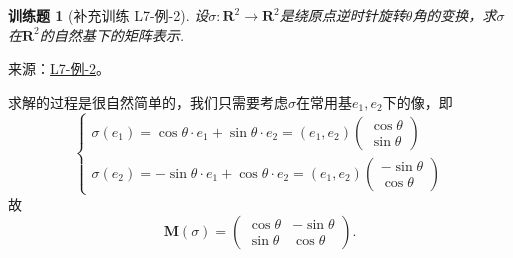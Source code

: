 \documentclass[UTF8,12pt,a4paper,fontset=fandol]{ctexart}
\newtheorem{exercise}{训练题}[section]
\begin{document}
\begin{exercise}[补充训练 L7-例-2]\label{prob:L7-例-2}
设$\sigma\colon\mathbf{R}^2\to\mathbf{R}^2$是绕原点逆时针旋转$\theta$角的变换，求$\sigma$在$\mathbf{R}^2$的自然基下的矩阵表示.
\end{exercise}
\noindent 来源：\href{https://github.com/yhwu-is/Linear-Algebra-Left-Undone/blob/new/%E8%AE%B2%E4%B9%89/%E4%B8%93%E9%A2%98/7%20%E7%BA%BF%E6%80%A7%E6%98%A0%E5%B0%84%E7%9F%A9%E9%98%B5%E8%A1%A8%E7%A4%BA%E4%B8%8E%E7%9F%A9%E9%98%B5%E8%BF%90%E7%AE%97%E5%9F%BA%E7%A1%80.tex}{L7-例-2}。
\begin{solve}
求解的过程是很自然简单的，我们只需要考虑$\sigma$在常用基$e_1,e_2$下的像，即
    \[
    \begin{cases}
        \sigma(e_1)=\cos\theta\cdot e_1+\sin\theta\cdot e_2=(e_1,e_2)\begin{pmatrix}
            \cos\theta \\ \sin\theta
        \end{pmatrix} \\
        \sigma(e_2)=-\sin\theta\cdot e_1+\cos\theta\cdot e_2=(e_1,e_2)\begin{pmatrix}
            -\sin\theta \\ \cos\theta
        \end{pmatrix}
    \end{cases}
    \]
    故
    \[\mathbf{M}(\sigma)=\begin{pmatrix}
        \cos\theta & -\sin\theta \\
        \sin\theta & \cos\theta
    \end{pmatrix}.\]
\end{solve}
\end{document}
